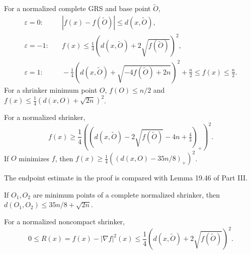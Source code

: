 \begin{corollary}
\label{cor:chow-iv-potential-bounds}
For a normalized complete GRS and base point $\widetilde O$,
\begin{align*}
\varepsilon=0:&\quad |f(x)-f(\widetilde O)|\le d(x,\widetilde O),\\
\varepsilon=-1:&\quad f(x)\le\tfrac14(d(x,\widetilde O)+2\sqrt{f(\widetilde O)})^2,\\
\varepsilon=1:&\quad -\tfrac14(d(x,\widetilde O)+\sqrt{-4f(\widetilde O)+2n})^2+\tfrac n2
\le f(x)\le\tfrac n2.
\end{align*}
For a shrinker minimum point $O$, $f(O)\le n/2$ and
$f(x)\le\frac14(d(x,O)+\sqrt{2n})^2$.
\end{corollary}

\begin{theorem}
\label{thm:chow-iv-potential-lower-bound}
For a normalized shrinker,
\[
f(x)\ge\frac14\left((d(x,\widetilde O)-2\sqrt{f(\widetilde O)}-4n+\tfrac43)_+\right)^2.
\]
If $O$ minimizes $f$, then
$f(x)\ge\frac14((d(x,O)-35n/8)_+)^2$.
\end{theorem}

\begin{remark}
\label{rem:chow-iv-potential-part-iii-comparison}
The endpoint estimate in the proof is compared with Lemma 19.46 of Part III.
\end{remark}

\begin{corollary}
\label{cor:chow-iv-potential-minima-distance}
If $O_1,O_2$ are minimum points of a complete normalized shrinker, then
$d(O_1,O_2)\le35n/8+\sqrt{2n}$.
\end{corollary}

\begin{lemma}
\label{lem:chow-iv-scalar-quadratic-upper}
For a normalized noncompact shrinker,
\[
0\le R(x)=f(x)-|\nabla f|^2(x)\le\frac14(d(x,\widetilde O)+2\sqrt{f(\widetilde O)})^2.
\]
\end{lemma}

